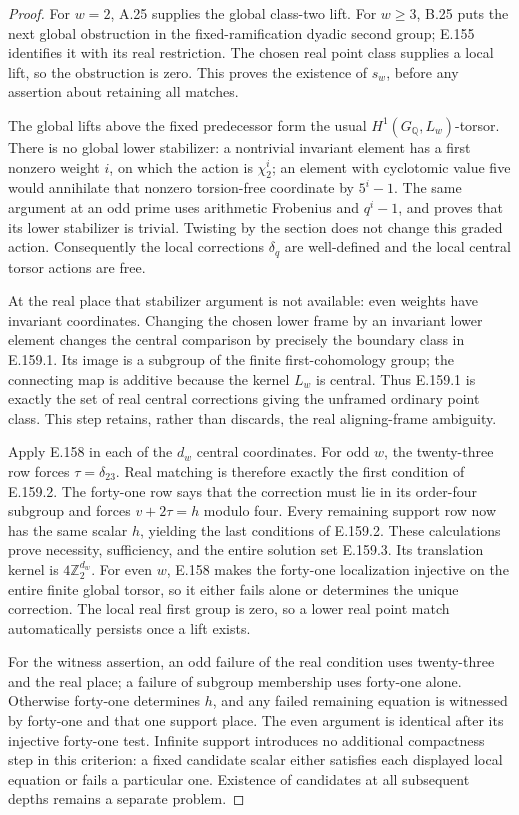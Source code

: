 \begin{proof}
For \(w=2\), A.25 supplies the global class-two lift.
For \(w\ge3\), B.25 puts the next global obstruction in the
fixed-ramification dyadic second group; E.155 identifies
it with its real restriction. The chosen real point
class supplies a local lift, so the obstruction is zero.
This proves the existence of \(s_w\), before any assertion
about retaining all matches.

The global lifts above the fixed predecessor form the
usual \(H^1(G_{\mathbb Q},L_w)\)-torsor. There is no
global lower stabilizer: a nontrivial invariant element
has a first nonzero weight \(i\), on which the action is
\(\chi_2^i\); an element with cyclotomic value five would
annihilate that nonzero torsion-free coordinate by
\(5^i-1\). The same argument at an odd prime uses
arithmetic Frobenius and \(q^i-1\), and proves that its
lower stabilizer is trivial. Twisting by the section
does not change this graded action. Consequently the
local corrections \(\delta_q\) are well-defined and the
local central torsor actions are free.

At the real place that stabilizer argument is not
available: even weights have invariant coordinates.
Changing the chosen lower frame by an invariant lower
element changes the central comparison by precisely the
boundary class in E.159.1. Its image is a subgroup of
the finite first-cohomology group; the connecting map
is additive because the kernel \(L_w\) is central.
Thus E.159.1 is exactly the set of real central
corrections giving the unframed ordinary point class.
This step retains, rather than discards, the real
aligning-frame ambiguity.

Apply E.158 in each of the \(d_w\) central coordinates.
For odd \(w\), the twenty-three row forces
\(\tau=\delta_{23}\). Real matching is therefore exactly
the first condition of E.159.2. The forty-one row says
that the correction must lie in its order-four subgroup
and forces \(v+2\tau=h\) modulo four. Every remaining
support row now has the same scalar \(h\), yielding the
last conditions of E.159.2. These calculations prove
necessity, sufficiency, and the entire solution set
E.159.3. Its translation kernel is \(4\mathbb Z_2^{d_w}\).
For even \(w\), E.158 makes the forty-one localization
injective on the entire finite global torsor, so it
either fails alone or determines the unique correction.
The local real first group is zero, so a lower real
point match automatically persists once a lift exists.

For the witness assertion, an odd failure of the real
condition uses twenty-three and the real place; a
failure of subgroup membership uses forty-one alone.
Otherwise forty-one determines \(h\), and any failed
remaining equation is witnessed by forty-one and that
one support place. The even argument is identical
after its injective forty-one test. Infinite support
introduces no additional compactness step in this
criterion: a fixed candidate scalar either satisfies
each displayed local equation or fails a particular
one. Existence of candidates at all subsequent depths
remains a separate problem.
\end{proof}
